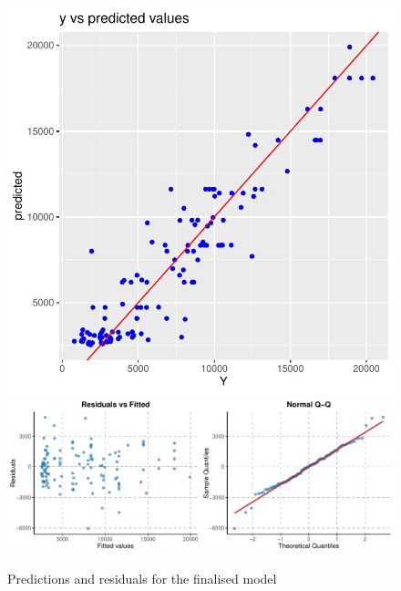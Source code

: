 \begin{figure}
    \centering
    \includegraphics[width=0.5\linewidth]{figures/mlr/y_vs_predicted_values_reduced_model.pdf}
    \includegraphics[width=1\linewidth]{figures/mlr/reduced_residuals_vs_fitted_qqplot.pdf}
    \caption{Predictions and residuals for the finalised model}
    \label{fig:final_model}
\end{figure}
